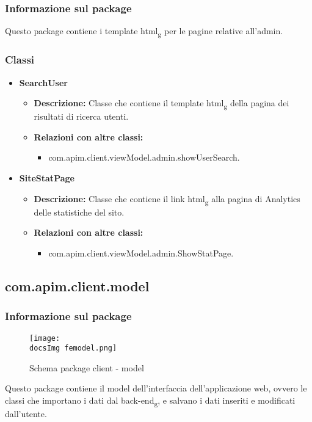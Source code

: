 {{		\subsubsection{Informazione sul package}{
			Questo package contiene i template html\textsubscript{g} per le pagine relative all'admin.
		}
		\subsubsection{Classi}{
			\begin{itemize}
				\item \textbf{SearchUser}
					\begin{itemize}
						\item \textbf{Descrizione:} Classe che contiene il template html\textsubscript{g} della pagina dei risultati di ricerca utenti.
						\item \textbf{Relazioni con altre classi:}
						\begin{itemize}
							\item com.apim.client.viewModel.admin.showUserSearch.
						\end{itemize}
					\end{itemize}
				\item \textbf{SiteStatPage}
					\begin{itemize}
						\item \textbf{Descrizione:} Classe che contiene il link html\textsubscript{g} alla pagina di Analytics delle statistiche del sito.
						\item \textbf{Relazioni con altre classi:}
						\begin{itemize}
							\item com.apim.client.viewModel.admin.ShowStatPage.
						\end{itemize}
					\end{itemize}	
			\end{itemize}
		}
	}
	\subsection{com.apim.client.model}{
		\subsubsection{Informazione sul package}{
			\begin{figure}[ht]
				\centering
				\texttt{[image: \\docsImg femodel.png]}
				\caption{Schema package client - model}
			\end{figure}
		Questo package contiene il model dell'interfaccia dell'applicazione web, ovvero le classi che importano i dati dal back-end\textsubscript{g}, e salvano i dati inseriti e modificati dall'utente.
		}
}}
